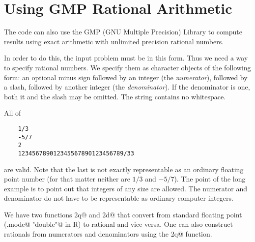 \documentclass{article}
\begin{document}
\section{Using GMP Rational Arithmetic} \label{sec:gmp}

The \verb@cddlib@ code can also use the GMP (GNU Multiple Precision) Library
to compute results using exact arithmetic with unlimited precision rational
numbers.

In order to do this, the input problem must be in this form.  Thus we
need a way to specify rational numbers.  We specify them as character
objects of the following form: an optional minus sign followed by an
integer (the \emph{numerator}), followed by a slash, followed by another
integer (the \emph{denominator}).  If the denominator is one, both it
and the slash may be omitted.  The string contains no whitespace.

\pagebreak[1]
All of
\begin{verbatim}
    1/3
    -5/7
    2
    123456789012345567890123456789/33
\end{verbatim}
are valid.  Note that the last is not exactly representable as an
ordinary floating point number (for that matter neither are $1 / 3$
and $- 5 / 7$).  The point of the long example is to point out that
integers of any size are allowed.  The numerator and denominator do
not have to be representable as ordinary computer integers.

We have two functions \verb@d2q@ and \verb@q2d@ that convert from
standard floating point (\verb@storage.mode@ \verb@"double"@ in R)
to rational and vice versa.  One can also construct rationals
from numerators and denominators using the \verb@z2q@ function.
\end{document}
